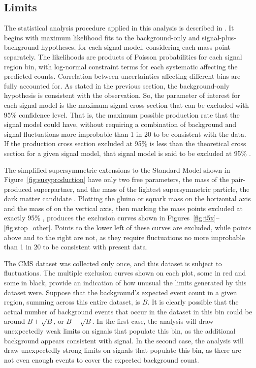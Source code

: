  \subsection{Limits} \label{sec:MT2limits}

  The \CLs statistical analysis procedure applied in this analysis is described in \cite{CLS_method}.
  It begins with maximum likelihood fits to the background-only and signal-plus-background hypotheses, for each signal model, considering each mass point separately. 
  The likelihoods are products of Poisson probabilities for each signal region bin, with log-normal constraint terms for each systematic affecting the predicted counts.
  Correlation between uncertainties affecting different bins are fully accounted for.
  As stated in the previous section, the background-only hypothesis is consistent with the observation.
  So, the parameter of interest for each signal model is the maximum signal cross section that can be excluded with 95\% confidence level.
  That is, the maximum possible production rate that the signal model could have, without requiring a combination of background and signal fluctuations more improbable than 1 in 20 to be consistent with the data.
  If the production cross section excluded at 95\% \CL is less than the theoretical cross section for a given signal model, that signal model is said to be excluded at 95\% \CL.

  The simplified supersymmetric extensions to the Standard Model shown in Figure~\ref{fig:susyproduction} have only two free parameters, the mass of the pair-produced superpartner, and the mass of the lightest supersymmetric particle, the dark matter candidate \lsp.
  Plotting the gluino or squark mass on the horizontal axis and the mass of \lsp on the vertical axis, then marking the mass points excluded at exactly 95\% \CL, produces the exclusion curves shown in Figures~\ref{fig:t5x}--\ref{fig:stop_other}.
  Points to the lower left of these curves are excluded, while points above and to the right are not, as they require fluctuations no more improbable than 1 in 20 to be consistent with present data.

  The CMS dataset was collected only once, and this dataset is subject to fluctuations.
  The multiple exclusion curves shown on each plot, some in red and some in black, provide an indication of how unusual the limits generated by this dataset were.
  Suppose that the background's expected event count in a given region, summing across this entire dataset, is $B$.
  It is clearly possible that the actual number of background events that occur in the dataset in this bin could be around $B+\sqrt{B}$, or $B-\sqrt{B}$.
  In the first case, the analysis will draw unexpectedly weak limits on signals that populate this bin, as the additional background appears consistent with signal.
  In the second case, the analysis will draw unexpectedly strong limits on signals that populate this bin, as there are not even enough events to cover the expected background count.

